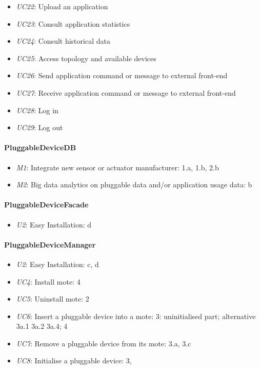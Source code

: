 \begin{itemize}
            \item \emph{UC22}: Upload an application
            \item \emph{UC23}: Consult application statistics
            \item \emph{UC24}: Consult historical data
            \item \emph{UC25}: Access topology and available devices
            \item \emph{UC26}: Send application command or message to external front-end
            \item \emph{UC27}: Receive application command or message to external front-end
            \item \emph{UC28}: Log in
            \item \emph{UC29}: Log out
        \end{itemize}

    \paragraph{PluggableDeviceDB}
        \begin{itemize}
            \item \emph{M1}: Integrate new sensor or actuator manufacturer: 1.a, 1.b, 2.b
            \item \emph{M2}: Big data analytics on pluggable data and/or application usage data: b
        \end{itemize}

    \paragraph{PluggableDeviceFacade}
        \begin{itemize}
        	\item \emph{U2}: Easy Installation: d
        \end{itemize}

    \paragraph{PluggableDeviceManager}
        \begin{itemize}
            \item \emph{U2}: Easy Installation: c, d
            \item \emph{UC4}: Install mote: 4
            \item \emph{UC5}: Uninstall mote: 2
            \item \emph{UC6}: Insert a pluggable device into a mote: 3: uninitialised part; alternative 3a.1 3a.2 3a.4; 4
            \item \emph{UC7}: Remove a pluggable device from its mote: 3.a, 3.c
            \item \emph{UC8}: Initialise a pluggable device: 3,
        \end{itemize}

